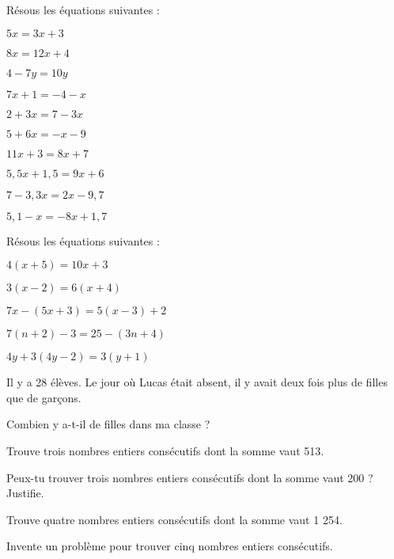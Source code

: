 \begin{exercice}[Équations du type $ax + b = cx + d$]

Résous les équations suivantes :

\begin{colenumerate}{2} 
\item $5x = 3x + 3$
\item $8x = 12x + 4$
\item $4 -7y = 10y$
\item $7x + 1 = -4 -x$
\item $2 + 3x = 7 -3x$
\item $5 + 6x = -x -9$
\item $11x + 3 = 8x + 7$
\item $5,5x + 1,5 = 9x + 6$
\item $7 -3,3x = 2x -9,7$
\item $5,1 -x = -8x + 1,7$
\end{colenumerate} 
\end{exercice}




\begin{exercice}

Résous les équations suivantes :

\begin{colenumerate}{1} 
\item $4(x + 5) = 10x + 3$
\item $3(x -2) = 6(x + 4)$
\item $7x -(5x + 3) = 5(x -3) + 2$
\item $7(n + 2) -3 = 25 -(3n + 4)$
\item $4y + 3(4y -2) = 3(y + 1)$
\end{colenumerate} 
\end{exercice}







\begin{exercice}
Il y a 28 élèves. Le jour où Lucas était absent, il y avait deux fois plus de filles que de garçons.

Combien y a-t-il de filles dans ma classe ?
\end{exercice}




\begin{exercice}

\begin{colenumerate}{1} 
\item Trouve trois nombres entiers consécutifs dont la somme vaut 513.
\item Peux-tu trouver trois nombres entiers consécutifs dont la somme vaut 200 ? Justifie.
\item Trouve quatre nombres entiers consécutifs dont la somme vaut 1 254.
\item Invente un problème pour trouver cinq nombres entiers consécutifs.
\end{colenumerate} 
\end{exercice}




